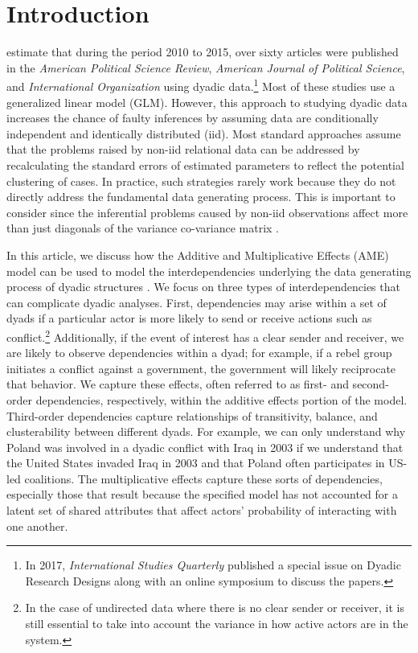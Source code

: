 \section{\textbf{Introduction}}

\citet{aronow:etal:2015} estimate that during the period 2010 to 2015, over sixty articles were published in the \textit{American Political Science Review}, \textit{American Journal of Political Science}, and \textit{International Organization} using dyadic data.\footnote{In 2017, \textit{International Studies Quarterly} published a special issue on Dyadic Research Designs along with an online symposium to discuss the papers.} Most of these studies use a generalized linear model (GLM).  However, this approach to studying dyadic data increases the chance of faulty inferences by assuming data are conditionally independent and identically distributed (iid). Most standard approaches assume that the problems raised by non-iid relational data can be addressed by recalculating the standard errors of estimated parameters to reflect the potential clustering of cases. In practice, such strategies rarely work because they do not directly address the fundamental data generating process. This is important to consider since the inferential problems caused by non-iid  observations affect more than just diagonals of the variance co-variance matrix \citep{beck:2012,franzese:hays:2007,king:roberts:2014}.

In this article, we discuss how the Additive and Multiplicative Effects (AME) model can be used to model the interdependencies underlying the data generating process of dyadic structures \citep{hoff:2008,minhas:etal:2018}. We focus on three types of interdependencies that can complicate dyadic analyses. First, dependencies may arise within a set of dyads if a particular actor is more likely to send or receive actions such as conflict.\footnote{In the case of undirected data where there is no clear sender or receiver, it is still essential to take into account the variance in how active actors are in the system.} Additionally, if the event of interest has a clear sender and receiver, we are likely to observe dependencies within a dyad; for example, if a rebel group initiates a conflict against a government, the government will likely reciprocate that behavior. We capture these effects, often referred to as first- and second-order dependencies, respectively, within the additive effects portion of the model. Third-order dependencies capture relationships of transitivity, balance, and clusterability between different dyads. For example, we can only understand why Poland was involved in a dyadic conflict with Iraq in 2003 if we understand that the United States invaded Iraq in 2003 and that Poland often participates in US-led coalitions. The multiplicative effects capture these sorts of dependencies, especially those that result because the specified model has not accounted for a latent set of shared attributes that affect actors' probability of interacting with one another.

